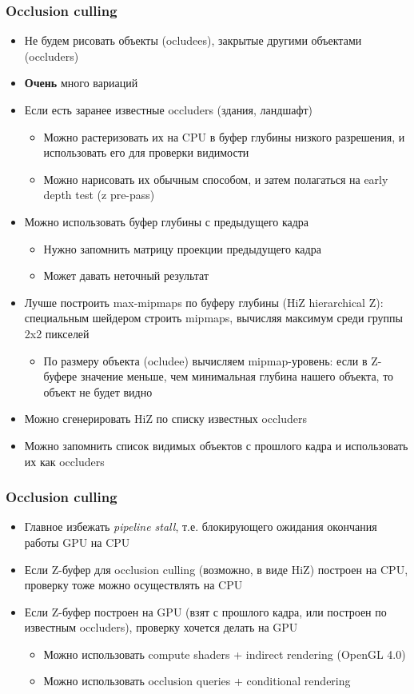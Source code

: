 \documentclass{beamer}
\begin{document}
\begin{frame}[fragile]
\fontsize{10pt}{10pt}
\frametitle{Occlusion culling}
\begin{itemize}
\item Не будем рисовать объекты (ocludees), закрытые другими объектами (occluders)
\pause
\item \textbf{Очень} много вариаций
\pause
\item Если есть заранее известные occluders (здания, ландшафт)
\pause
\begin{itemize}
\item Можно растеризовать их на CPU в буфер глубины низкого разрешения, и использовать его для проверки видимости
\pause
\item Можно нарисовать их обычным способом, и затем полагаться на early depth test (z pre-pass)
\end{itemize}
\pause
\item Можно использовать буфер глубины с предыдущего кадра
\pause
\begin{itemize}
\item Нужно запомнить матрицу проекции предыдущего кадра
\pause
\item Может давать неточный результат
\end{itemize}
\pause
\item Лучше построить max-mipmaps по буферу глубины (HiZ \textendash{} hierarchical Z): специальным шейдером строить mipmaps, вычисляя максимум среди группы 2x2 пикселей
\pause
\begin{itemize}
\item По размеру объекта (ocludee) вычисляем mipmap-уровень: если в Z-буфере значение меньше, чем минимальная глубина нашего объекта, то объект не будет видно
\end{itemize}
\pause
\item Можно сгенерировать HiZ по списку известных occluders
\pause
\item Можно запомнить список видимых объектов с прошлого кадра и использовать их как occluders
\end{itemize}
\end{frame}

\begin{frame}[fragile]
\frametitle{Occlusion culling}
\begin{itemize}
\item Главное \textendash{} избежать \textit{pipeline stall}, т.е. блокирующего ожидания окончания работы GPU на CPU
\pause
\item Если Z-буфер для occlusion culling (возможно, в виде HiZ) построен на CPU, проверку тоже можно осуществлять на CPU
\pause
\item Если Z-буфер построен на GPU (взят с прошлого кадра, или построен по известным occluders), проверку хочется делать на GPU
\pause
\begin{itemize}
\item Можно использовать compute shaders + indirect rendering (OpenGL 4.0)
\pause
\item Можно использовать occlusion queries + conditional rendering
\end{itemize}
\end{itemize}
\end{frame}
\end{document}
